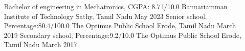 
\begin{cventries}
  \cventry
    {Bachelor of engineering in Mechatronics, CGPA: 8.71/10.0} %
    {Bannariamman Institute of Technology} %
    {Sathy, Tamil Nadu} %
    {May 2023} %
    {
    }
  \cventry
    {Senior school, Percentage:80.4/100.0} %
    {The Optimus Public School} %
    {Erode, Tamil Nadu} %
    {March 2019} %
    {
    }
  \cventry
    {Secondary school, Percentage:9.2/10.0} %
    {The Optimus Public School} %
    {Erode, Tamil Nadu} %
    {March 2017} %
    {
    }
\end{cventries}
